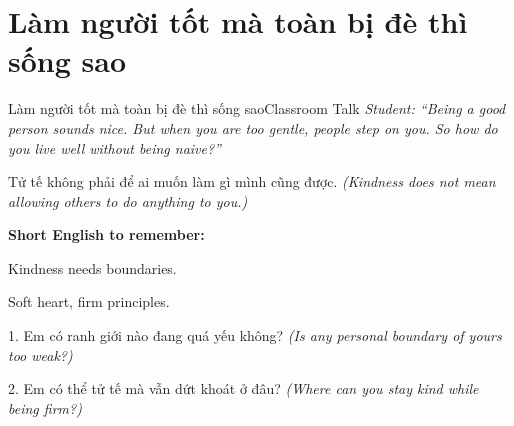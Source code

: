 \section{Làm người tốt mà toàn bị đè thì sống sao}
\begin{truyen}{Làm người tốt mà toàn bị đè thì sống sao}{Classroom Talk}
\textit{Student: ``Being a good person sounds nice. But when you are too gentle, people step on you. So how do you live well without being naive?''}\\[4pt]



\end{truyen}

\begin{baihoc}
Tử tế không phải để ai muốn làm gì mình cũng được.
\textit{(Kindness does not mean allowing others to do anything to you.)}
\end{baihoc}

\begin{ghinhoanh}
\textbf{Short English to remember:}

Kindness needs boundaries.

Soft heart, firm principles.
\end{ghinhoanh}

\begin{tuhocnhanh}
1. Em có ranh giới nào đang quá yếu không? \textit{(Is any personal boundary of yours too weak?)}

2. Em có thể tử tế mà vẫn dứt khoát ở đâu? \textit{(Where can you stay kind while being firm?)}
\end{tuhocnhanh}
\ngancach

